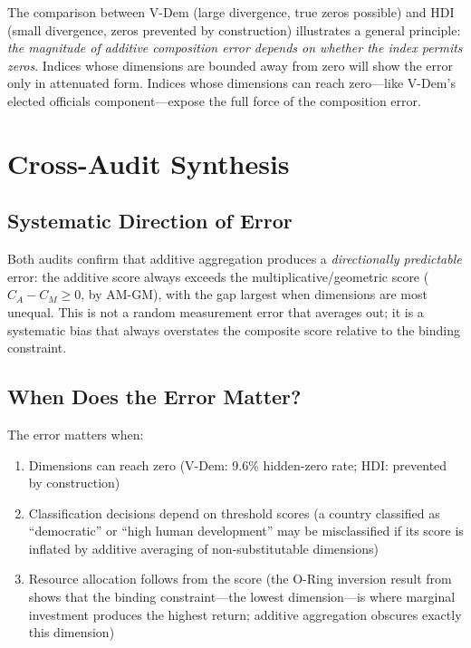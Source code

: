 \documentclass[12pt]{article}
\begin{document}
The comparison between V-Dem (large divergence, true zeros possible) and HDI (small divergence, zeros prevented by construction) illustrates a general principle: \emph{the magnitude of additive composition error depends on whether the index permits zeros}. Indices whose dimensions are bounded away from zero will show the error only in attenuated form. Indices whose dimensions can reach zero---like V-Dem's elected officials component---expose the full force of the composition error.


\section{Cross-Audit Synthesis}

\subsection{Systematic Direction of Error}

Both audits confirm that additive aggregation produces a \emph{directionally predictable} error: the additive score always exceeds the multiplicative/geometric score ($C_A - C_M \geq 0$, by AM-GM), with the gap largest when dimensions are most unequal. This is not a random measurement error that averages out; it is a systematic bias that always overstates the composite score relative to the binding constraint.

\subsection{When Does the Error Matter?}

The error matters when:
\begin{enumerate}
\item Dimensions can reach zero (V-Dem: 9.6\% hidden-zero rate; HDI: prevented by construction)
\item Classification decisions depend on threshold scores (a country classified as ``democratic'' or ``high human development'' may be misclassified if its score is inflated by additive averaging of non-substitutable dimensions)
\item Resource allocation follows from the score (the O-Ring inversion result from \citet{kirsch2026mc} shows that the binding constraint---the lowest dimension---is where marginal investment produces the highest return; additive aggregation obscures exactly this dimension)
\end{enumerate}
\end{document}

